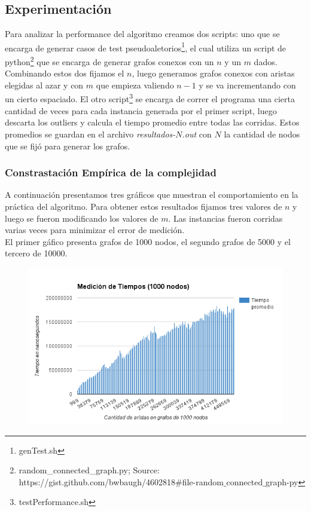 \subsection{Experimentación}

Para analizar la performance del algoritmo creamos dos scripts: uno que se encarga de generar casos de test pseudoaletorios\footnote{genTest.sh}, el cual utiliza un script de python\footnote{random_connected_graph.py; Source: https://gist.github.com/bwbaugh/4602818$\#$file-random$\_$connected$\_$graph-py} que se encarga de generar grafos conexos con un $n$ y un $m$ dados. Combinando estos dos fijamos el $n$, luego generamos grafos conexos con aristas elegidas al azar y con $m$ que empieza valiendo $n-1$ y se va incrementando con un cierto espaciado. El otro script\footnote{testPerformance.sh} se encarga de correr el programa una cierta cantidad de veces para cada instancia generada por el primer script, luego descarta los outliers y calcula el tiempo promedio entre todas las corridas. Estos promedios se guardan en el archivo \emph{resultados-$N$.out} con $N$ la cantidad de nodos que se fijó para generar los grafos.

\newpage

\subsubsection{Constrastación Empírica de la complejidad}

A continuación presentamos tres gráficos que muestran el comportamiento en la práctica del algoritmo. Para obtener estos resultados fijamos tres valores de $n$ y luego se fueron modificando los valores de $m$. Las instancias fueron corridas varias veces para minimizar el error de medición.\\

El primer gáfico presenta grafos de 1000 nodos, el segundo grafos de 5000 y el tercero de 10000.

\begin{figure}[h!]
	\centering
 	\includegraphics[scale=0.8]{imagenes/ej3/tiempos1000.png}
 \end{figure}

